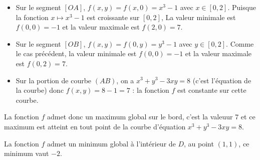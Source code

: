 {\begin{enumerate}
\begin{enumerate}
{    		\begin{itemize}
    			\item Sur le segment $[OA]$, $f(x,y) = f(x,0) = x^3 - 1$ avec $x \in [0,2]$. Puisque la fonction $x \mapsto x^3-1$ est croissante sur $[0,2]$, La valeur minimale est $f(0,0) = -1$ et la valeur maximale est $f(2,0) = 7$. 
    			\item Sur le segment $[OB]$, $f(x,y) = f(0,y) = y^3 - 1$ avec $y \in [0,2]$. Comme le cas précédent, la valeur minimale est $f(0,0) = -1$ et la valeur maximale est $f(0,2) = 7$.
    			\item Sur la portion de courbe $(AB)$, on a $x^3 + y^3 - 3xy = 8$  (c'est l'équation de la courbe) donc $f(x,y) = 8-1 = 7$ : la fonction $f$ est constante sur cette courbe. 
    		\end{itemize}	
    	La fonction $f$ admet donc un maximum global sur le bord, c'est la valeuur $7$ et ce maximum est atteint en tout point de la courbe d'équation $x^3 + y^3 - 3xy = 8$. 
    	
    	La fonction $f$ admet un minimum global à l'intérieur de $D$, au point $(1,1)$, ce minimum vaut $-2$.
     }
    \end{enumerate}
\end{enumerate}}
